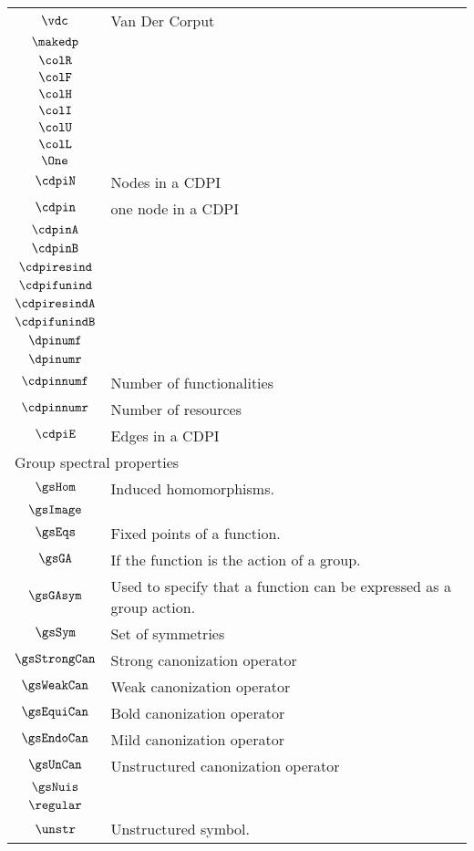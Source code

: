 \begin{longtable}{cl}
 $\vdc$ &  Van Der Corput\\ 
 $\makedp$ & \\ 
 $\colR$ & \\ 
 $\colF$ & \\ 
 $\colH$ & \\ 
 $\colI$ & \\ 
 $\colU$ & \\ 
 $\colL$ & \\ 
 $\One$ & \\ 
 $\cdpiN$ &  Nodes in a CDPI\\ 
 $\cdpin$ &  one node in a CDPI\\ 
 $\cdpinA$ & \\ 
 $\cdpinB$ & \\ 
 $\cdpiresind$ & \\ 
 $\cdpifunind$ & \\ 
 $\cdpiresindA$ & \\ 
 $\cdpifunindB$ & \\ 
 $\dpinumf$ & \\ 
 $\dpinumr$ & \\ 
 $\cdpinnumf$ &  Number of functionalities\\ 
 $\cdpinnumr$ &  Number of resources\\ 
 $\cdpiE$ &  Edges in a CDPI\\ 
 \multicolumn{2}{l}{Group spectral properties}\\ 
 \hline
$\gsHom$ &  Induced homomorphisms.\\ 
 $\gsImage$ &  \\ 
 $\gsEqs$ &  Fixed points of a function.\\ 
 $\gsGA$ &  If the function is the action of a group.\\ 
 $\gsGAsym$ &  Used to specify that a function can be expressed as a group action.\\ 
 $\gsSym$ &  Set of symmetries\\ 
 $\gsStrongCan$ &  Strong canonization operator\\ 
 $\gsWeakCan$ &  Weak canonization operator\\ 
 $\gsEquiCan$ &  Bold canonization operator\\ 
 $\gsEndoCan$ &  Mild canonization operator\\ 
 $\gsUnCan$ &  Unstructured canonization operator\\ 
 $\gsNuis$ &  \\ 
 $\regular$ & \\ 
 $\unstr$ &  Unstructured symbol.\\ 

\end{longtable}
